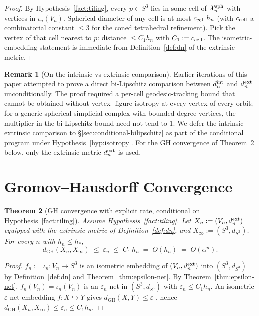 \documentclass[11pt, a4paper]{amsart}
\newtheorem{theorem}{Theorem}[section]
\theoremstyle{definition}
\newtheorem{remark}[theorem]{Remark}
\newcommand{\dGH}{d_{\mathrm{GH}}}
\newcommand{\dsph}{d_{S^3}}
\begin{document}
\begin{proof}
By Hypothesis~\ref{fact:tiling}, every $p \in S^3$ lies in some cell
of $\mathcal X_n^{\rm sph}$ with vertices in $\iota_n(V_n)$.
Spherical diameter of any cell is at most $c_{\rm cell}\,h_n$
(with $c_{\rm cell}$ a combinatorial constant $\leq 3$ for the
coned tetrahedral refinement). Pick the vertex of that cell
nearest to $p$: distance $\leq C_1 h_n$ with $C_1 :=
c_{\rm cell}$. The isometric-embedding statement is immediate
from Definition~\ref{def:dn} of the extrinsic metric.
\end{proof}

\begin{remark}[On the intrinsic-vs-extrinsic comparison]
\label{rmk:bilipschitz-conditional}
Earlier iterations of this paper attempted to prove a direct
bi-Lipschitz comparison between $d_n^{\rm int}$ and
$d_n^{\rm ext}$ unconditionally. The proof required a per-cell
geodesic-tracking bound that cannot be obtained without vertex-
figure isotropy at every vertex of every orbit; for a generic
spherical simplicial complex with bounded-degree vertices, the
multiplier in the bi-Lipschitz bound need not tend to $1$. We
defer the intrinsic-extrinsic comparison to
\S\ref{sec:conditional-bilipschitz} as part of the conditional
program under Hypothesis~\ref{hyp:isotropy}. For the
GH convergence of Theorem~\ref{thm:gh-convergence}
below, only the extrinsic metric $d_n^{\rm ext}$ is used.
\end{remark}

\section{Gromov--Hausdorff Convergence}
\label{sec:gh}

\begin{theorem}[GH convergence with explicit rate, conditional on Hypothesis~\ref{fact:tiling}]
\label{thm:gh-convergence}
\emph{Assume Hypothesis~\ref{fact:tiling}.}
Let $X_n := (V_n, d_n^{\rm ext})$ equipped with the extrinsic
metric of Definition~\ref{def:dn}, and $X_\infty := (S^3,
\dsph)$. For every $n$ with $h_n \leq h_\ast$,
\[
  \dGH(X_n, X_\infty) \;\leq\; \varepsilon_n \;\leq\; C_1\,h_n
    \;=\; O(h_n) \;=\; O(\alpha^n).
\]
\end{theorem}

\begin{proof}
$f_n := \iota_n \colon V_n \to S^3$ is an isometric embedding of
$(V_n, d_n^{\rm ext})$ into $(S^3, \dsph)$ by
Definition~\ref{def:dn} and Theorem~\ref{thm:epsilon-net}. By
Theorem~\ref{thm:epsilon-net}, $f_n(V_n) = \iota_n(V_n)$ is an
$\varepsilon_n$-net in $(S^3, \dsph)$ with $\varepsilon_n \leq
C_1 h_n$. An isometric $\varepsilon$-net embedding $f \colon
X \hookrightarrow Y$ gives $\dGH(X, Y) \leq \varepsilon$
\cite[Prop.~7.3.10]{BuragoBuragoIvanov}, hence $\dGH(X_n,
X_\infty) \leq \varepsilon_n \leq C_1 h_n$.
\end{proof}
\end{document}

